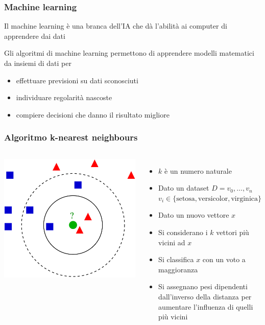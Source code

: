 \documentclass{beamer}
\begin{document}
	\begin{frame}
		\frametitle{Machine learning}
	
		Il machine learning è una branca dell'IA che dà l'abilità ai computer di apprendere dai dati

		Gli algoritmi di machine learning permettono di apprendere modelli matematici da insiemi di 
		dati per

		\begin{itemize}
			\item effettuare previsioni su dati sconosciuti
			\item individuare regolarità nascoste
			\item compiere decisioni che danno il risultato migliore
		\end{itemize}
	
	\end{frame}

	\begin{frame}
		\frametitle{Algoritmo k-nearest neighbours}
		
		\begin{columns}
				\includegraphics[width=\textwidth]{gfx/KnnClassification}
			\begin{itemize}
				\item $k$ è un numero naturale
				\item Dato un dataset $D = v_0, \ldots, v_n$ \\ $v_i\in\{ \text{setosa}, \text{versicolor}, \text{virginica} \}$
				\item Dato un nuovo vettore $x$
				\item Si considerano i $k$ vettori più vicini ad $x$ 
				\item Si classifica $x$ con un voto a maggioranza 
				\item Si assegnano pesi dipendenti dall'inverso della distanza per aumentare l'influenza di quelli più vicini
			\end{itemize}
		\end{columns}

	\end{frame}
\end{document}

